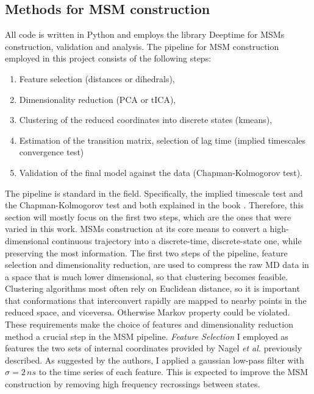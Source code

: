 \documentclass[prl,twocolumn]{revtex4-1}
\begin{document}
\subsection{Methods for MSM construction}
All code is written in Python and employs the library Deeptime \cite{deeptime} for MSMs construction, validation and analysis.
The pipeline for MSM construction employed in this project consists of the following steps:
\begin{enumerate}
    \setlength{\itemsep}{0.01em}
\item Feature selection (distances or dihedrals),
\item Dimensionality reduction (PCA or tICA),
\item Clustering of the reduced coordinates into discrete states (kmeans),
\item Estimation of the transition matrix, selection of lag time (implied timescales convergence test)
\item Validation of the final model against the data (Chapman-Kolmogorov test).
\end{enumerate}
The pipeline is standard in the field. Specifically, the implied timescale test and the Chapman-Kolmogorov test  and both explained in the book \cite{thebible}. 
Therefore, this section will mostly focus on the first two steps, which are the ones that were varied in this work. MSMs construction at its core means to convert a high-dimensional continuous trajectory into a discrete-time, discrete-state one, while preserving the most information.
The first two steps of the pipeline, feature selection and dimensionality reduction, are used to compress the raw MD data in a space that is much lower dimensional, so that clustering becomes feasible.
Clustering algorithms most often rely on Euclidean distance, so it is important that conformations that interconvert rapidly are mapped to nearby points in the reduced space, and viceversa. Otherwise Markov property could be violated. These requirements make the choice of features and dimensionality reduction method a crucial step in the MSM pipeline.
\vspace{0.2em}
\newline \textit{Feature Selection}
I employed as features the two sets of internal coordinates provided by Nagel \textit{et al.}  previously described. As suggested by the authors, I applied a gaussian low-pass filter with $\sigma = 2\,ns$ to the time series of each feature. This is expected to improve the MSM construction by removing high frequency recrossings between states.
\end{document}
